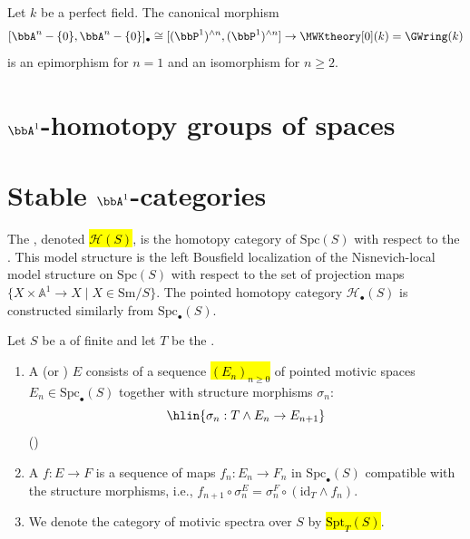 \begin{theorem}
    Let $k$ be a perfect field. The canonical morphism 
    $$[\bbA^n - \{0\}, \bbA^n - \{0\}]_\bullet \cong [(\bbP^1)^{\wedge n}, (\bbP^1)^{\wedge n}] \to \MWKtheory[0](k) = \GWring(k)$$
    is an epimorphism for $n = 1$ and an isomorphism for $n \geq 2$.
\end{theorem}



\section{\texorpdfstring{$\bbA^1$}{A1}-homotopy groups of spaces}

\section{Stable \texorpdfstring{$\bbA^1$}{A1}-categories}

\TODO{}
\begin{definition}
The , denoted \hl{$\mathcal{H}(S)$}, is the homotopy category of $\text{Spc}(S)$ with respect to the . This model structure is the left Bousfield localization of the Nisnevich-local model structure on $\text{Spc}(S)$ with respect to the set of projection maps $\{X \times \mathbb{A}^1 \to X \mid X \in \text{Sm}/S\}$. The pointed homotopy category $\mathcal{H}_{\bullet}(S)$ is constructed similarly from $\text{Spc}_{\bullet}(S)$.
\end{definition}

\begin{definition}
Let $S$ be a  of finite  and let $T$ be the . 

\begin{enumerate}
    \item A  (or ) $E$ consists of a sequence \hl{$(E_n)_{n \geq 0}$} of pointed motivic spaces $E_n \in \text{Spc}_{\bullet}(S)$ together with structure morphisms $\sigma_n$:
    $$\hlin{ \sigma_n: T \wedge E_n \to E_{n+1} }$$
    ()

    \item A  $f: E \to F$ is a sequence of maps $f_n: E_n \to F_n$ in $\text{Spc}_{\bullet}(S)$ compatible with the structure morphisms, i.e., $f_{n+1} \circ \sigma_n^E = \sigma_n^F \circ (\text{id}_T \wedge f_n)$. 

    \item We denote the category of motivic spectra over $S$ by \hl{$\text{Spt}_{T}(S)$}.
\end{enumerate}
\end{definition}

